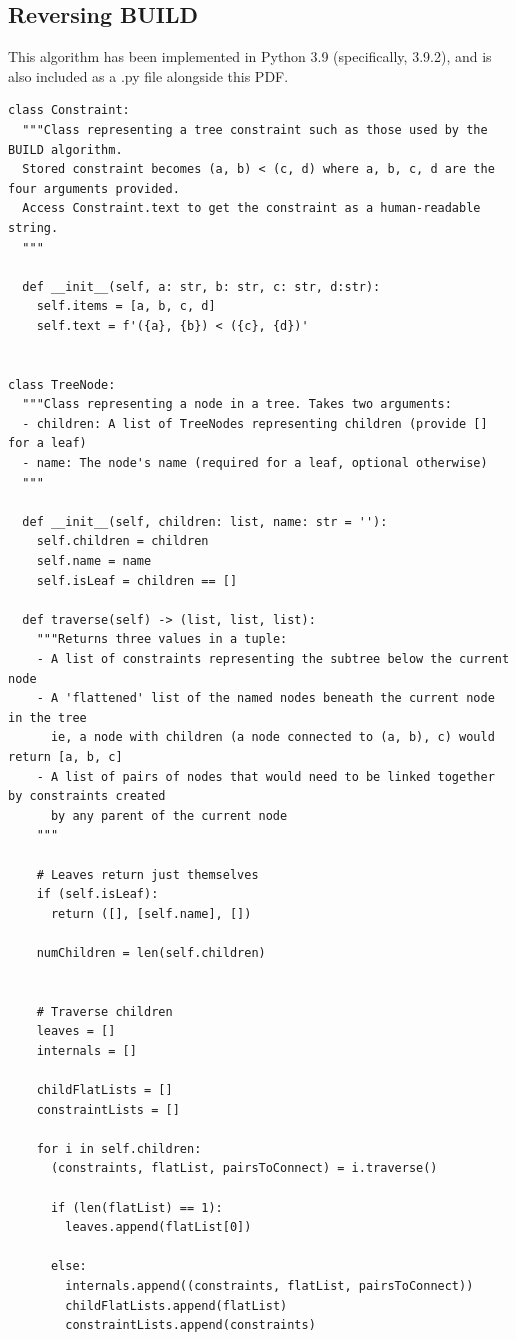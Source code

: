 \documentclass[11pt]{article} %
\begin{document}
\begin{landscape}
\subsection{Reversing BUILD}
This algorithm has been implemented in Python 3.9 (specifically, 3.9.2), and is also included as a .py file alongside this PDF.
\begin{lstlisting}
class Constraint:
  """Class representing a tree constraint such as those used by the BUILD algorithm.
  Stored constraint becomes (a, b) < (c, d) where a, b, c, d are the four arguments provided.
  Access Constraint.text to get the constraint as a human-readable string.
  """

  def __init__(self, a: str, b: str, c: str, d:str):
    self.items = [a, b, c, d]
    self.text = f'({a}, {b}) < ({c}, {d})'


class TreeNode:
  """Class representing a node in a tree. Takes two arguments:
  - children: A list of TreeNodes representing children (provide [] for a leaf)
  - name: The node's name (required for a leaf, optional otherwise)
  """

  def __init__(self, children: list, name: str = ''):
    self.children = children
    self.name = name
    self.isLeaf = children == []
  
  def traverse(self) -> (list, list, list):
    """Returns three values in a tuple:
    - A list of constraints representing the subtree below the current node
    - A 'flattened' list of the named nodes beneath the current node in the tree
      ie, a node with children (a node connected to (a, b), c) would return [a, b, c]
    - A list of pairs of nodes that would need to be linked together by constraints created
      by any parent of the current node
    """

    # Leaves return just themselves
    if (self.isLeaf):
      return ([], [self.name], [])
    
    numChildren = len(self.children)


    # Traverse children
    leaves = []
    internals = []

    childFlatLists = []
    constraintLists = []

    for i in self.children:
      (constraints, flatList, pairsToConnect) = i.traverse()

      if (len(flatList) == 1):
        leaves.append(flatList[0])
      
      else:
        internals.append((constraints, flatList, pairsToConnect))
        childFlatLists.append(flatList)
        constraintLists.append(constraints)


\end{lstlisting}
\end{landscape}
\end{document}
